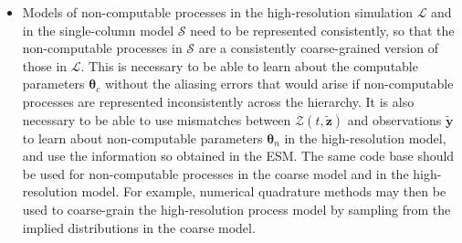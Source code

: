 \documentclass{article}
\renewcommand{\vec}[1]{\boldsymbol{{#1}}}
\begin{document}
\begin{itemize}
    \item  Models of non-computable processes in the high-resolution simulation $\mathcal{L}$ and in the single-column model $\mathcal{S}$ need to be represented consistently, so that the non-computable processes in $\mathcal{S}$ are a consistently coarse-grained version of those in $\mathcal{L}$. This is necessary to be able to learn about the computable parameters $\vec{\theta}_c$ without the aliasing errors that would arise if non-computable processes are represented inconsistently across the hierarchy. It is also necessary to be able to use mismatches between $\mathcal{Z}(t, \vec{\tilde z})$ and observations $\vec{\tilde y}$ to learn about non-computable parameters $\vec{\theta}_n$ in the high-resolution model, and use the information so obtained in the ESM. The same code base should be used for non-computable processes in the coarse model and in the high-resolution model. For example, numerical quadrature methods may then be used to coarse-grain the high-resolution process model by sampling from the implied distributions in the coarse model.
\end{itemize}
\end{document}
